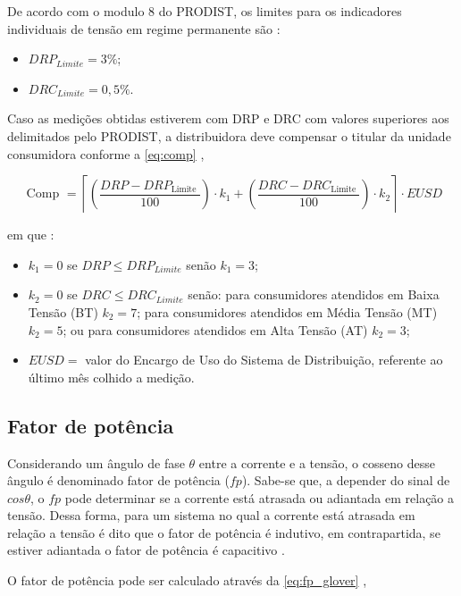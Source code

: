 De acordo com o modulo 8 do PRODIST, os limites para os indicadores individuais de tensão em regime permanente são \cite{ref:ANEEL2021}:

\begin{itemize}
  \item $DRP_{Limite}=3\%$;
  \item $DRC_{Limite}=0,5\%$.
\end{itemize}

Caso as medições obtidas estiverem com DRP e DRC com valores superiores aos delimitados pelo PRODIST, a distribuidora deve compensar o titular da unidade consumidora conforme a \autoref{eq:comp} \cite{ref:ANEEL2021},

\begin{equation}
  \text { Comp }=\left\lceil\left(\frac{DRP - DRP_{\text {Limite }}}{100}\right) \cdot k_1+\left(\frac{D R C-D R C_{\text {Limite }}}{100}\right) \cdot k_2\right\rceil \cdot EUSD
  \label{eq:comp}
\end{equation}

\noindent
em que \cite{ref:ANEEL2021}:

\begin{itemize}
  \item $k_1=0$ se $DRP \leq DRP_{Limite}$ senão $k_1=3$;
  \item $k_2=0$ se $DRC \leq DRC_{Limite}$ senão: para consumidores atendidos em Baixa Tensão (BT) $k_2=7$; para consumidores atendidos em Média Tensão (MT) $k_2=5$; ou para consumidores atendidos em Alta Tensão (AT) $k_2=3$;
  \item $EUSD =$ valor do Encargo de Uso do Sistema de Distribuição, referente ao último mês colhido a medição.
\end{itemize}

\subsection{Fator de potência}

Considerando um ângulo de fase $\theta$ entre a corrente e a tensão, o cosseno desse ângulo é denominado fator de potência ($fp$). Sabe-se que, a depender do sinal de $cos\theta$, o $fp$ pode determinar se a corrente está atrasada ou adiantada em relação a tensão. Dessa forma, para um sistema no qual a corrente está atrasada em relação a tensão é dito que o fator de potência é indutivo, em contrapartida, se estiver adiantada o fator de potência é capacitivo \cite{ref:glover_2017}.

O fator de potência pode ser calculado através da \autoref{eq:fp_glover} \cite{ref:glover_2017},


